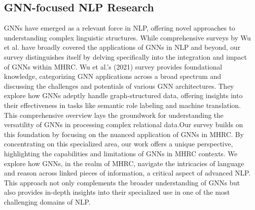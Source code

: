 \documentclass[sigplan,screen,nonacm]{acmart}
\begin{document}
\subsection{GNN-focused NLP Research}

GNNs have emerged as a relevant force in NLP, offering novel approaches to understanding complex linguistic structures. While comprehensive surveys by Wu et al. \cite{RN23, RN16} have broadly covered the applications of GNNs in NLP and beyond, our survey 
distinguishes itself by delving specifically into the integration and impact of GNNs within MHRC. Wu et al.'s (2021) \cite{RN16} survey provides foundational knowledge, categorizing GNN applications across a broad spectrum and discussing the challenges and potentials of various GNN architectures. 
They explore how GNNs adeptly handle graph-structured data, offering insights into their effectiveness in tasks like semantic role labeling and machine translation. This comprehensive overview lays the groundwork for understanding the versatility of GNNs in processing complex relational data.Our survey 
builds on this foundation by focusing on the nuanced application of GNNs in MHRC. By concentrating on this specialized area, our work offers a unique perspective, highlighting the capabilities and limitations of GNNs in MHRC contexts. We explore how GNNs, in the realm of MHRC, navigate the 
intricacies of language and reason across linked pieces of information, a critical aspect of advanced NLP. This approach not only complements the broader understanding of GNNs but also provides in-depth insights into their specialized use in one of the most challenging domains of NLP.
\end{document}
